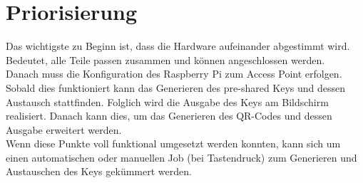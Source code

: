 \documentclass[a4paper]{article}
\begin{document}
	\section{Priorisierung}
	
	Das wichtigste zu Beginn ist, dass die Hardware aufeinander abgestimmt wird. Bedeutet, alle Teile passen zusammen und können angeschlossen werden.\\
	Danach muss die Konfiguration des Raspberry Pi zum Access Point erfolgen. Sobald dies funktioniert kann das Generieren des pre-shared Keys und dessen Austausch stattfinden. Folglich wird die Ausgabe des Keys am Bildschirm realisiert. Danach kann dies, um das Generieren des QR-Codes und dessen Ausgabe erweitert werden.\\
	Wenn diese Punkte voll funktional umgesetzt werden konnten, kann sich um einen automatischen oder manuellen Job (bei Tastendruck) zum Generieren und Austauschen des Keys gekümmert werden.
	
\end{document}
